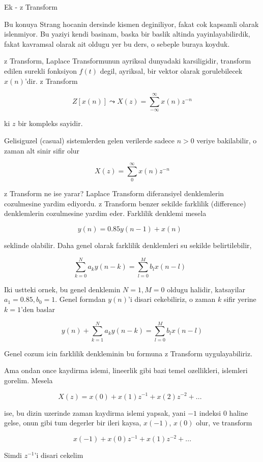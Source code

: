 \documentclass[12pt,fleqn]{article}
\begin{document}
Ek - z Transform 

Bu konuya Strang hocanin dersinde kismen deginiliyor, fakat cok kapsamli
olarak islenmiyor. Bu yaziyi kendi basinam, baska bir baslik altinda
yayinlayabilirdik, fakat kavramsal olarak ait oldugu yer bu ders, o sebeple
buraya koyduk.

z Transform, Laplace Transformunun ayriksal dunyadaki karsiligidir,
transform edilen surekli fonksiyon $f(t)$ degil, ayriksal, bir vektor
olarak gorulebilecek $x(n)$'dir. z Transform

\[ Z[x(n)] \leadsto X(z) = \sum_{-\infty}^{\infty} x(n)z^{-n}  \]

ki $z$ bir kompleks sayidir. 

Gelisiguzel (casual) sistemlerden gelen verilerde sadece $n>0$ veriye
bakilabilir, o zaman alt sinir sifir olur

\[ X(z) = \sum_{0}^{\infty} x(n)z^{-n}  \]

z Transform ne ise yarar? Laplace Transform diferansiyel denklemlerin
cozulmesine yardim ediyordu. z Transform benzer sekilde farklilik
(difference) denklemlerin cozulmesine yardim eder. Farklilik denklemi
mesela

\[ y(n) = 0.85 y(n-1) + x(n) 
\ \ \ \label{3}
\]

seklinde olabilir. Daha genel olarak farklilik denklemleri su sekilde
belirtilebilir,

\[ \sum_{k=0}^N a_k y(n-k) = \sum_{l=0}^M b_l x(n-l) 
\ \ \ \label{1}
\]

Iki ustteki ornek, bu genel denklemin $N=1,M=0$ oldugu halidir, katsayilar
$a_1 = 0.85,b_0=1$. Genel formdan $y(n)$'i disari cekebiliriz, o zaman
$k$ sifir yerine $k=1$'den baslar

\[ y(n) + \sum_{k=1}^N a_k y(n-k) = \sum_{l=0}^M b_l x(n-l) \]

Genel cozum icin farklilik denkleminin bu formuna z Transform
uygulayabiliriz. 

Ama ondan once kaydirma islemi, lineerlik gibi bazi temel ozellikleri,
islemleri gorelim. Mesela

\[ X(z) = x(0) + x(1)z^{-1} + x(2) z^{-2} + ... 
\ \ \ \label{2}
\]

ise, bu dizin uzerinde zaman kaydirma islemi yapsak, yani $-1$ indeksi $0$
haline gelse, onun gibi tum degerler bir ileri kaysa, $x(-1)$, $x(0)$ olur,
ve transform

\[ x(-1) + x(0)z^{-1} + x(1) z^{-2} + ...\]

Simdi $z^{-1}$'i disari cekelim
\end{document}
